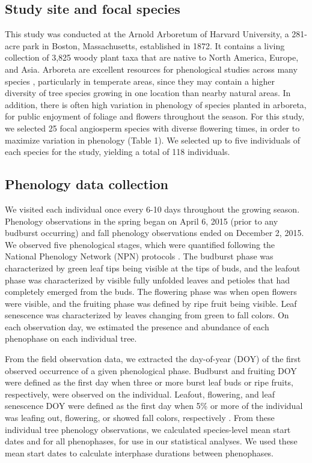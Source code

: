 \documentclass{article}
\begin{document}
\subsection*{Study site and focal species}
This study was conducted at the Arnold Arboretum of Harvard University, a 281-acre park in Boston, Massachusetts, established in 1872. It contains a living collection of 3,825 woody plant taxa that are native to North America, Europe, and Asia. Arboreta are excellent resources for phenological studies across many species \citep [e.g., ][]{primack2009a}, particularly in temperate areas, since they may contain a higher diversity of tree species growing in one location than nearby natural areas. In addition, there is often high variation in phenology of species planted in arboreta, for public enjoyment of foliage and flowers throughout the season. For this study, we selected 25 focal angiosperm species with diverse flowering times, in order to maximize variation in phenology (Table 1). We selected up to five individuals of each species for the study, yielding a total of 118 individuals.

\subsection*{Phenology data collection}
We visited each individual once every 6-10 days throughout the growing season. Phenology observations in the spring began on April 6, 2015 (prior to any budburst occurring) and fall phenology observations ended on December 2, 2015. We observed five phenological stages, which were quantified following the National Phenology Network (NPN) protocols \citep[for a full description see][]{denny2014}. The budburst phase was characterized by green leaf tips being visible at the tips of buds, and the leafout phase was characterized by visible fully unfolded leaves and petioles that had completely emerged from the buds. %
The flowering phase was when open flowers were visible, and the fruiting phase was defined by ripe fruit being visible. Leaf senescence was characterized by leaves changing from green to fall colors. On each observation day, we estimated the presence and abundance of each phenophase on each individual tree.
\par From the field observation data, we extracted the day-of-year (DOY) of the first observed occurrence of a given phenological phase. Budburst and fruiting DOY were defined as the first day when three or more burst leaf buds or ripe fruits, respectively, were observed on the individual. Leafout, flowering, and leaf senescence DOY were defined as the first day when 5\% or more of the individual was leafing out, flowering, or showed fall colors, respectively \citep{denny2014}. 
From these individual tree phenology observations, we calculated species-level mean start dates and for all phenophases, for use in our statistical analyses. We used these mean start dates to calculate interphase durations between phenophases. 
\end{document}
